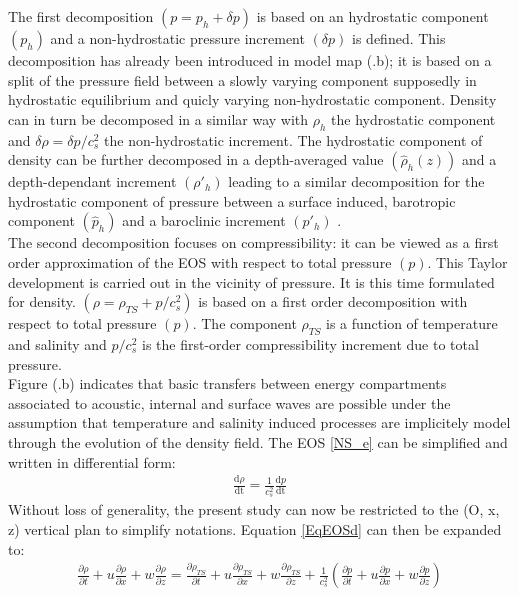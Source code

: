 \documentclass[a4paper,11pt]{article}
\begin{document}
The first decomposition $(p=p_h+\delta p)$ is based on an hydrostatic component $(p_h)$ and a non-hydrostatic pressure increment $(\delta p)$ is defined. This decomposition has already been introduced in model map (.b); it is based on a split of the pressure field between a slowly varying component supposedly in hydrostatic equilibrium and quicly varying non-hydrostatic component. Density can in turn be decomposed in a similar way with $\rho_h$ the hydrostatic component and $\delta \rho=\delta p/c_s^2$ the non-hydrostatic increment. The hydrostatic component of density can be further decomposed in a depth-averaged value $(\hat{\rho}_h(z))$ and a depth-dependant increment $(\rho'_h)$ leading to a similar decomposition for the hydrostatic component of pressure between a surface induced, barotropic component $(\hat{p}_h)$ and a baroclinic increment $(p'_h)$ .\\
The second decomposition focuses on compressibility: it can be viewed as a first order approximation of the EOS with respect to total pressure $(p)$. This Taylor development is carried out in the vicinity of pressure. It is this time formulated for density.
 $(\rho=\rho_{TS}+p/c_s^2)$ is based on a first order decomposition with respect to total pressure $(p)$. The component $\rho_{TS}$ is a function of temperature and salinity and $p/c_s^2$ is the first-order compressibility increment due to total pressure. \\ 
 Figure (.b) indicates that basic transfers between energy compartments associated to acoustic, internal and surface waves are possible under the assumption that temperature and salinity induced processes are implicitely model through the evolution of the density field.
The EOS \ref{NS_e} can be simplified and written in differential form:
\begin{subequations}
\begin{alignat}{2}
	\displaystyle 
	 \frac{\textrm{d}\rho}{\textrm{dt}}=
	\frac{1}{c_s^2}  \frac{\textrm{d} p}{\textrm{dt}}
	\label{EqEOSd}
\end{alignat}
\end{subequations}
Without loss of generality, the present study can now be restricted to the (O, x, z) vertical plan to simplify notations. Equation \ref{EqEOSd} can then be expanded to:
\begin{subequations}
\begin{alignat}{2}
	\label{EqEOS1}
	\displaystyle 
	 \frac{\partial\rho}{\partial t} 
	 +u \frac{\partial \rho}{\partial x}
	 +w \frac{\partial \rho}{\partial z}=
	 \frac{\partial  \rho_{TS}}{\partial t} 
	 +u \frac{\partial  \rho_{TS}}{\partial x}
	 +w \frac{\partial  \rho_{TS}}{\partial z}
	 +\frac{1}{c_s^2}\left(\frac{\partial p}{\partial t} 
	 +u \frac{\partial p}{\partial x}
	 +w \frac{\partial p}{\partial z}\right)
\end{alignat}
\end{subequations}
\end{document}
